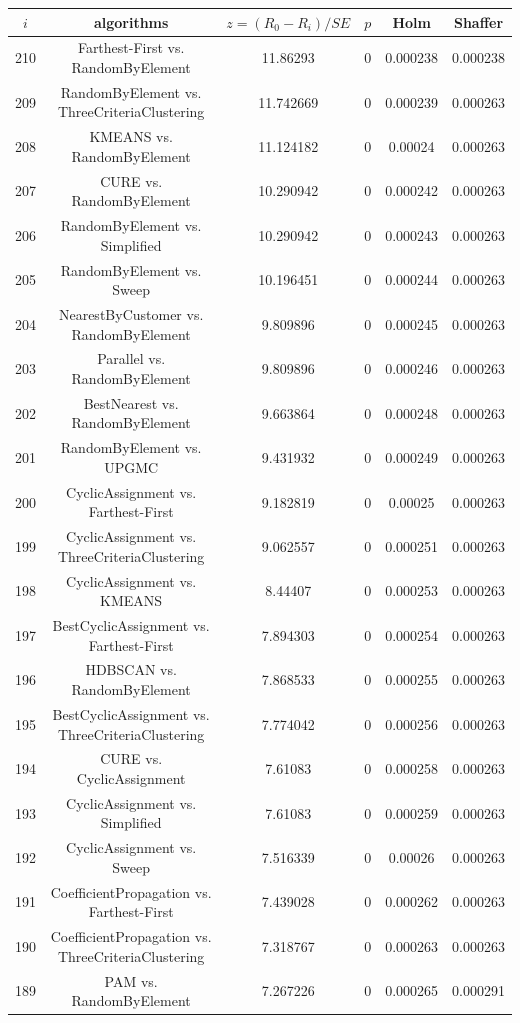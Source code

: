 \documentclass[a4paper,10pt]{article}
\begin{document}
\begin{landscape}
\begin{table}[!htp]
\centering\scriptsize
\begin{tabular}{cccccc}
$i$&algorithms&$z=(R_0 - R_i)/SE$&$p$&Holm&Shaffer\\
\hline210&Farthest-First vs. RandomByElement&11.86293&0&0.000238&0.000238\\
209&RandomByElement vs. ThreeCriteriaClustering&11.742669&0&0.000239&0.000263\\
208&KMEANS vs. RandomByElement&11.124182&0&0.00024&0.000263\\
207&CURE vs. RandomByElement&10.290942&0&0.000242&0.000263\\
206&RandomByElement vs. Simplified&10.290942&0&0.000243&0.000263\\
205&RandomByElement vs. Sweep&10.196451&0&0.000244&0.000263\\
204&NearestByCustomer vs. RandomByElement&9.809896&0&0.000245&0.000263\\
203&Parallel vs. RandomByElement&9.809896&0&0.000246&0.000263\\
202&BestNearest vs. RandomByElement&9.663864&0&0.000248&0.000263\\
201&RandomByElement vs. UPGMC&9.431932&0&0.000249&0.000263\\
200&CyclicAssignment vs. Farthest-First&9.182819&0&0.00025&0.000263\\
199&CyclicAssignment vs. ThreeCriteriaClustering&9.062557&0&0.000251&0.000263\\
198&CyclicAssignment vs. KMEANS&8.44407&0&0.000253&0.000263\\
197&BestCyclicAssignment vs. Farthest-First&7.894303&0&0.000254&0.000263\\
196&HDBSCAN vs. RandomByElement&7.868533&0&0.000255&0.000263\\
195&BestCyclicAssignment vs. ThreeCriteriaClustering&7.774042&0&0.000256&0.000263\\
194&CURE vs. CyclicAssignment&7.61083&0&0.000258&0.000263\\
193&CyclicAssignment vs. Simplified&7.61083&0&0.000259&0.000263\\
192&CyclicAssignment vs. Sweep&7.516339&0&0.00026&0.000263\\
191&CoefficientPropagation vs. Farthest-First&7.439028&0&0.000262&0.000263\\
190&CoefficientPropagation vs. ThreeCriteriaClustering&7.318767&0&0.000263&0.000263\\
189&PAM vs. RandomByElement&7.267226&0&0.000265&0.000291\\

\end{tabular}
\end{table}
\end{landscape}
\end{document}
